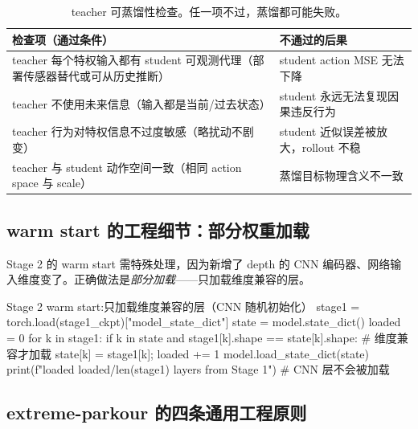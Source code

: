 \begin{table}[H]
\centering
\small
\caption{teacher 可蒸馏性检查。任一项不过，蒸馏都可能失败。}
\label{tab:rlmc-priv-distillable}
\begin{tabular}{@{}p{6.2cm}p{5.6cm}@{}}
\toprule
检查项（通过条件） & 不通过的后果 \\
\midrule
teacher 每个特权输入都有 student 可观测代理（部署传感器替代或可从历史推断） & student action MSE 无法下降 \\
teacher 不使用未来信息（输入都是当前/过去状态） & student 永远无法复现因果违反行为 \\
teacher 行为对特权信息不过度敏感（略扰动不剧变） & student 近似误差被放大，rollout 不稳 \\
teacher 与 student 动作空间一致（相同 action space 与 scale） & 蒸馏目标物理含义不一致 \\
\bottomrule
\end{tabular}
\end{table}

\subsection{warm start 的工程细节：部分权重加载}
\label{sec:rlmc-priv-warmstart}

Stage 2 的 warm start 需特殊处理，因为新增了 depth 的 CNN 编码器、网络输入维度变了。正确做法是\emph{部分加载}——只加载维度兼容的层。

\begin{codebox}[Python]{Stage 2 warm start:只加载维度兼容的层（CNN 随机初始化）}
stage1 = torch.load(stage1_ckpt)["model_state_dict"]
state  = model.state_dict()
loaded = 0
for k in stage1:
    if k in state and stage1[k].shape == state[k].shape:  # 维度兼容才加载
        state[k] = stage1[k]; loaded += 1
model.load_state_dict(state)
print(f"loaded {loaded}/{len(stage1)} layers from Stage 1")  # CNN 层不会被加载
\end{codebox}


\subsection{extreme-parkour 的四条通用工程原则}
\label{sec:rlmc-priv-parkour-principles}

